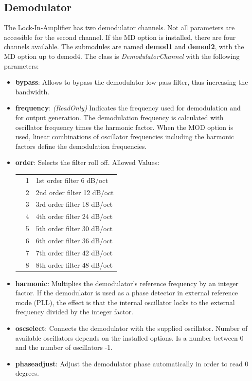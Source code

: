 \documentclass[11pt]{article} %
\begin{document}
\subsection{Demodulator}
The Lock-In-Amplifier has two demodulator channels. Not all parameters are accessible for the second channel. If the MD option is installed, there are four channels available. The submodules are named {\bf demod1} and {\bf demod2}, \small{with the MD option up to demod4}. The class is {\it DemodulatorChannel} with the following parameters:
	\begin{itemize}
	\item {\bf bypass}: Allows to bypass the demodulator low-pass filter, thus increasing the bandwidth.
	\item {\bf frequency}: {\it (ReadOnly)} Indicates the frequency used for demodulation and for output generation. The demodulation frequency is calculated with oscillator frequency times the harmonic factor. When the MOD option is used, linear combinations of oscillator frequencies including the harmonic factors define the demodulation frequencies.
	\item {\bf order}: Selects the filter roll off. Allowed Values:
	\begin{longtable}{p{1.5cm}p{1cm}p{14cm}}
	& 1 & 1st order filter 6 dB/oct \\
	& 2 & 2nd order filter 12 dB/oct \\
	& 3 & 3rd order filter 18 dB/oct \\
	& 4 & 4th order filter 24 dB/oct \\
	& 5 & 5th order filter 30 dB/oct \\
	& 6 & 6th order filter 36 dB/oct \\
	& 7 & 7th order filter 42 dB/oct \\
	& 8 & 8th order filter 48 dB/oct \\
	\end{longtable}
	\item {\bf harmonic}: Multiplies the demodulator's reference frequency by an integer factor. If the demodulator is used as a phase detector in external reference mode (PLL), the effect is that the internal oscillator locks to the external frequency divided by the integer factor.
	\item {\bf oscselect}: Connects the demodulator with the supplied oscillator. Number of available oscillators depends on the installed options. Is a number between 0 and the number of oscillators -1.
	\item {\bf phaseadjust}: Adjust the demodulator phase automatically in order to read 0 degrees.

\end{itemize}
\end{document}
